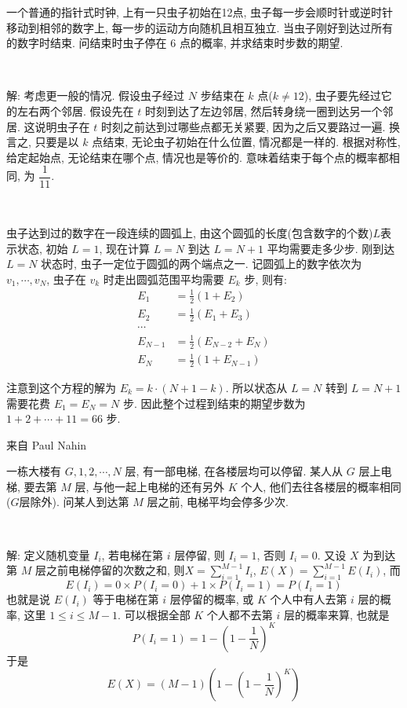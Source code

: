 \newpage

一个普通的指针式时钟, 上有一只虫子初始在12点, 虫子每一步会顺时针或逆时针移动到相邻的数字上, 每一步的运动方向随机且相互独立. 当虫子刚好到达过所有的数字时结束. 问结束时虫子停在 6 点的概率, 并求结束时步数的期望.

~

解: 考虑更一般的情况. 假设虫子经过 $N$ 步结束在 $k$ 点($k\neq 12$), 虫子要先经过它的左右两个邻居. 假设先在 $t$ 时刻到达了左边邻居, 然后转身绕一圈到达另一个邻居. 这说明虫子在 $t$ 时刻之前达到过哪些点都无关紧要, 因为之后又要路过一遍. 换言之, 只要是以 $k$ 点结束, 无论虫子初始在什么位置, 情况都是一样的. 根据对称性, 给定起始点, 无论结束在哪个点, 情况也是等价的. 意味着结束于每个点的概率都相同, 为 $\dfrac{1}{11}$.

~

虫子达到过的数字在一段连续的圆弧上, 由这个圆弧的长度(包含数字的个数)$L$表示状态, 初始 $L=1$, 现在计算 $L=N$ 到达 $L=N+1$ 平均需要走多少步. 刚到达 $L=N$ 状态时, 虫子一定位于圆弧的两个端点之一. 记圆弧上的数字依次为 $v_1, \cdots, v_N$, 虫子在 $v_k$ 时走出圆弧范围平均需要 $E_k$ 步, 则有:
\begin{align*}
E_1 &= \frac{1}{2}(1+E_2) \\
E_2 &= \frac{1}{2}(E_1+E_3) \\
\cdots & \\
E_{N-1} &= \frac{1}{2}(E_{N-2}+E_N) \\
E_N &= \frac{1}{2}(1+E_{N-1})
\end{align*}

注意到这个方程的解为 $E_k = k\cdot(N+1-k)$. 所以状态从 $L=N$ 转到 $L=N+1$ 需要花费 $E_1=E_N = N$ 步. 因此整个过程到结束的期望步数为 $1+2+\cdots + 11 = 66$ 步.

\newpage

\noindent 来自 Paul Nahin

一栋大楼有 $G,1,2,\cdots,N$ 层, 有一部电梯, 在各楼层均可以停留. 某人从 $G$ 层上电梯, 要去第 $M$ 层, 与他一起上电梯的还有另外 $K$ 个人, 他们去往各楼层的概率相同 ($G$层除外). 问某人到达第 $M$ 层之前, 电梯平均会停多少次.

~

解: 定义随机变量 $I_i$, 若电梯在第 $i$ 层停留, 则 $I_i = 1$, 否则 $I_i = 0$. 又设 $X$ 为到达第 $M$ 层之前电梯停留的次数之和, 则$\displaystyle X = \sum_{i=1}^{M-1}I_i$, $\displaystyle E(X) = \sum_{i=1}^{M-1} E(I_i)$, 而
\[E(I_i) = 0\times P(I_i = 0) + 1\times P(I_i=1) = P(I_i=1)\]
也就是说 $E(I_i)$ 等于电梯在第 $i$ 层停留的概率, 或 $K$ 个人中有人去第 $i$ 层的概率, 这里 $1\le i\le M - 1$. 可以根据全部 $K$ 个人都不去第 $i$ 层的概率来算, 也就是
\[
P(I_i=1) = 1 - (1-\frac{1}{N})^K
\]
于是
\[
E(X) = (M-1)\left(1-(1-\frac{1}{N})^K\right)
\]


